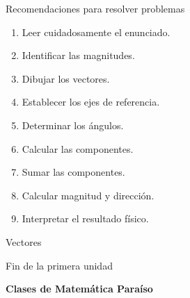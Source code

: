 \documentclass[aspectratio=169,11pt]{beamer}
\begin{document}
\begin{frame}{Recomendaciones para resolver problemas}

\begin{enumerate}
\item Leer cuidadosamente el enunciado.
\item Identificar las magnitudes.
\item Dibujar los vectores.
\item Establecer los ejes de referencia.
\item Determinar los ángulos.
\item Calcular las componentes.
\item Sumar las componentes.
\item Calcular magnitud y dirección.
\item Interpretar el resultado físico.
\end{enumerate}

\end{frame}

\begin{frame}

\centering

{\Huge\color{azuloscuro}
Vectores
}

\vspace{0.5cm}

{\Large
Fin de la primera unidad
}

\vspace{0.6cm}

\textbf{Clases de Matemática Paraíso}

\end{frame}
\end{document}
